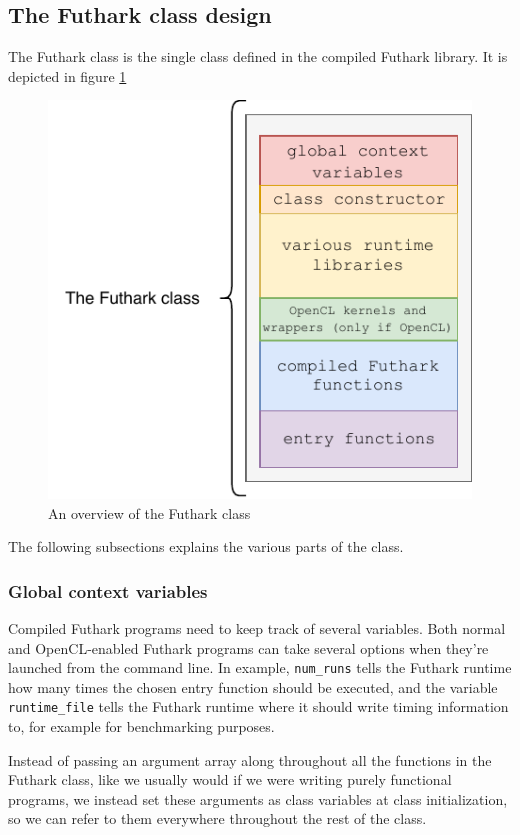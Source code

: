 \subsection{The Futhark class design}
\label{subsec:futharkclass}
The Futhark class is the single class defined in the compiled Futhark library.
It is depicted in figure \ref{fig:futharkclass}
\begin{figure}[h]
  \centering
  \includegraphics{chapters/figs/csharp/futhark_class.pdf}
  \caption{An overview of the Futhark class}
  \label{fig:futharkclass}
\end{figure}
The following subsections explains the various parts of the class.

\subsubsection{Global context variables}
\label{globalcontextvariables}
Compiled Futhark programs need to keep track of several variables.
Both normal and OpenCL-enabled Futhark \csharp{} programs can take several
options when they're launched from the command line. In example,
\texttt{num\_runs} tells the Futhark runtime how many times the chosen entry
function should be executed, and the variable \texttt{runtime\_file} tells the
Futhark runtime where it should write timing information to, for example for
benchmarking purposes.

Instead of passing an argument array along throughout all the functions in the
Futhark class, like we usually would if we were writing purely functional
programs, we instead set these arguments as class variables at class
initialization, so we can refer to them everywhere throughout the rest of the class.

